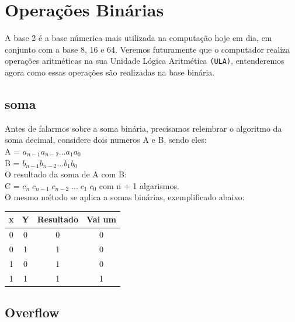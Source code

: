 \documentclass[12pt, onecolumn]{article}
\begin{document}
	\section{\centering Operações Binárias}

	A base 2 é a base númerica mais utilizada na computação hoje em dia, 
	em conjunto com a base 8, 16 e 64. Veremos futuramente que o 
	computador realiza operações aritméticas na sua Unidade Lógica 
	Aritmética \texttt{(ULA)}, entenderemos	agora como essas operações 
	são realizadas na base binária.

	\subsection{\centering soma}

	Antes de falarmos sobre a soma binária, precisamos relembrar o algoritmo da
	soma decimal, considere dois numeros A e B, sendo eles:\\
	\newline
	A = $a_{n-1} a_{n-2} ... a_1 a_0$\\
	B = $b_{n-1} b_{n-2} ... b_1 b_0$\\
	\newline
	O resultado da soma de A com B:\\
	\newline
	C = ${c_n}\;c_{n-1}\;c_{n-2}\;...\;c_{1}\;c_{0}$ com n + 1 algarismos. \\
	\newline
	O mesmo método se aplica a somas binárias, exemplificado abaixo:
	\begin{table}[h]
		\centering
		\begin{tabular}{|c|c|c|c|}
			\hline
			x & Y & Resultado & Vai um \\ \hline
			0 & 0 & 0 & 0 \\ \hline
			0 & 1 & 1 & 0 \\ \hline
			1 & 0 & 1 & 0 \\ \hline
			1 & 1 & 1 & 1 \\ \hline
		\end{tabular}
	\end{table}
	
	\subsection{\centering Overflow}
\end{document}
